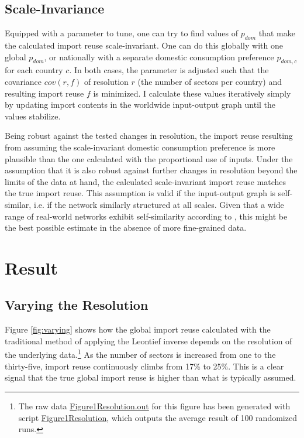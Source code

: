 \documentclass[english]{uzhpub}
\begin{document}
\subsection{Scale-Invariance}
\label{met:scale-invariance}
Equipped with a parameter to tune, one can try to find values of $p_{dom}$ that make the calculated import reuse scale-invariant. One can do this globally with one global $p_{dom}$, or nationally with a separate domestic consumption preference $p_{dom,c}$ for each country $c$. In both cases, the parameter is adjusted such that the covariance $cov(r, f)$ of resolution $r$ (the number of sectors per country) and resulting import reuse $f$ is minimized. I calculate these values iteratively simply by updating import contents in the worldwide input-output graph until the values stabilize.

Being robust against the tested changes in resolution, the import reuse resulting from assuming the scale-invariant domestic consumption preference is more plausible than the one calculated with the proportional use of inputs. Under the assumption that it is also robust against further changes in resolution beyond the limits of the data at hand, the calculated scale-invariant import reuse matches the true import reuse. This assumption is valid if the input-output graph is self-similar, i.e. if the network similarly structured at all scales. Given that a wide range of real-world networks exhibit self-similarity according to \cite{song2005self}, this might be the best possible estimate in the absence of more fine-grained data.

\section{Result}
\label{sec:result}

\subsection{Varying the Resolution}
\label{res:varying}

Figure \ref{fig:varying} shows how the global import reuse calculated with the traditional method of applying the Leontief inverse depends on the resolution of the underlying data.\footnote{The raw data \href{https://github.com/meisserecon/importreuse/blob/master/src/com/meissereconomics/seminar/run/Figure1Resolution.out}{Figure1Resolution.out} for this figure has been generated with script \href{https://github.com/meisserecon/importreuse/blob/master/src/com/meissereconomics/seminar/run/Figure1Resolution.java}{Figure1Resolution}, which outputs the average result of 100 randomized runs.} As the number of sectors is increased from one to the thirty-five, import reuse continuously climbs from 17\% to 25\%. This is a clear signal that the true global import reuse is higher than what is typically assumed.
\end{document}
